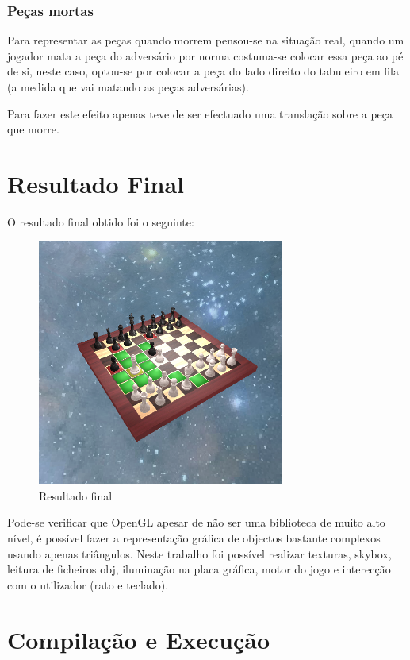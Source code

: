 \documentclass[portugues,final]{revdetua}
\begin{document}
\subsubsection{Peças mortas}

Para representar as peças quando morrem pensou-se na situação real, quando um jogador mata a peça do adversário por norma costuma-se colocar essa peça ao pé de si, neste caso, optou-se por colocar a peça do lado direito do tabuleiro em fila (a medida que vai matando as peças adversárias). 

Para fazer este efeito apenas teve de ser efectuado uma translação sobre a peça que morre.

\section{Resultado Final}

O resultado final obtido foi o seguinte:

\begin{figure}[H]
\centerline{\includegraphics[width=230pt]{images/sample.png}}
\caption{Resultado final}
\label{img:complete}
\end{figure}

Pode-se verificar que OpenGL apesar de não ser uma biblioteca de muito alto nível, é possível fazer a representação gráfica de objectos bastante complexos usando apenas triângulos. Neste trabalho foi possível realizar texturas, skybox, leitura de ficheiros obj, iluminação na placa gráfica, motor do jogo e interecção com o utilizador (rato e teclado).

\section{Compilação e Execução}
\end{document}

